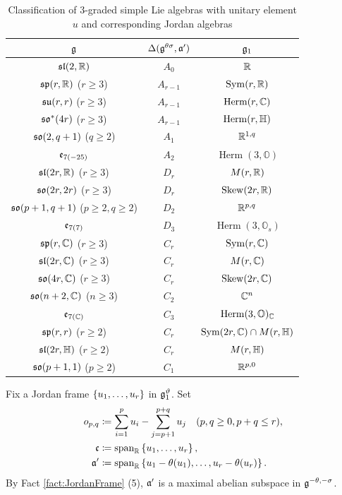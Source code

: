\begin{table}[htbp]
	\centering
	\small
	\renewcommand{\arraystretch}{1.15}
	\begin{tabular}{c|c|c}
		$\mathfrak{g}$ & $\Delta(\mathfrak{g}^{\theta\sigma}, \mathfrak{a}')$ & $\mathfrak{g}_1$ \\
		\hline
		$\mathfrak{sl}(2, \mathbb{R})$ & $A_0$ & $\mathbb{R}$ \\
		$\mathfrak{sp}(r, \mathbb{R})$ ($r \geq 3$) & $A_{r-1}$ & $\operatorname{Sym}(r, \mathbb{R})$ \\
		$\mathfrak{su}(r, r)$ ($r \geq 3$) & $A_{r-1}$ & $\operatorname{Herm}(r, \mathbb{C})$ \\
		$\mathfrak{so}^*(4r)$ ($r \geq 3$) & $A_{r-1}$ & $\operatorname{Herm}(r, \mathbb{H})$ \\
		$\mathfrak{so}(2, q+1)$ ($q \geq 2$) & $A_1$ & $\mathbb{R}^{1,q}$ \\
		$\mathfrak{e}_{7(-25)}$ & $A_2$ & $\operatorname{Herm}(3, \mathbb{O})$ \\ \hline
		$\mathfrak{sl}(2r, \mathbb{R})$ ($r \geq 3$) & $D_r$ & $M(r, \mathbb{R})$ \\
		$\mathfrak{so}(2r, 2r)$ ($r \geq 3$) & $D_r$ & $\operatorname{Skew}(2r, \mathbb{R})$ \\
		$\mathfrak{so}(p+1, q+1)$ ($p\geq 2,q \geq 2$) & $D_2$ & $\mathbb{R}^{p,q}$ \\
		$\mathfrak{e}_{7(7)}$ & $D_3$ & $\operatorname{Herm}(3, \mathbb{O}_s)$ \\ \hline
		$\mathfrak{sp}(r, \mathbb{C})$ ($r \geq 3$) & $C_r$ & $\operatorname{Sym}(r, \mathbb{C})$ \\
		$\mathfrak{sl}(2r, \mathbb{C})$ ($r \geq 3$) & $C_r$ & $M(r, \mathbb{C})$ \\
		$\mathfrak{so}(4r, \mathbb{C})$ ($r \geq 3$) & $C_r$ & $\operatorname{Skew}(2r, \mathbb{C})$ \\
		$\mathfrak{so}(n+2, \mathbb{C})$ ($n \geq 3$) & $C_2$ & $\mathbb{C}^n$ \\
		$\mathfrak{e}_{7(\mathbb{C})}$ & $C_3$ & $\operatorname{Herm}(3, \mathbb{O})_{\mathbb{C}}$ \\ \hline
		$\mathfrak{sp}(r, r)$ ($r \geq 2$) & $C_r$ & $\operatorname{Sym}(2r, \mathbb{C}) \cap M(r, \mathbb{H})$ \\
		$\mathfrak{sl}(2r, \mathbb{H})$ ($r \geq 2$) & $C_r$ & $M(r, \mathbb{H})$ \\
		$\mathfrak{so}(p+1, 1)$ ($p \geq 2$) & $C_1$ & $\mathbb{R}^{p,0}$
	\end{tabular}
	\caption{Classification of $3$-graded simple Lie algebras with unitary element $u$ and corresponding Jordan algebras}
	\label{table:JordanAlgebra}
\end{table}

Fix a Jordan frame $\left\{u_1, \ldots, u_r \right\}$ in $\mathfrak{g}_1^\vartheta$.
Set
\begin{align}
	o_{p, q} &\coloneq \sum_{i=1}^p u_i - \sum_{j=p+1}^{p+q} u_j \quad (p, q \geq 0, p+q \leq r), \nonumber \\
	\mathfrak{c} &\coloneq \mathrm{span}_{\mathbb{R}}\left\{u_1, \ldots, u_r\right\}, \nonumber \\
	\mathfrak{a'} &\coloneq \mathrm{span}_{\mathbb{R}}\left\{u_1 - \theta(u_1), \ldots, u_{r} - \theta(u_{r})\right\}. \label{eqn:DefineOCA}
\end{align}
By Fact \ref{fact:JordanFrame} (5), $\mathfrak{a'}$ is a maximal abelian subspace in $\mathfrak{g}^{-\theta, -\sigma}$.

